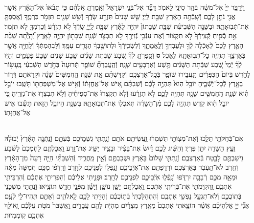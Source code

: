 \documentclass[twoside, openany, parskip=half, 11pt]{book}
\begin{document}
\begin{footnotesize}
\begin{multicols}{2}
\\
וַיְֿדַבֵּ֤ר יְיָ֙ אֶל־מֹשֶׁ֔ה בְּֿהַ֥ר סִינַ֖י לֵאמֹֽר׃ דַּבֵּ֞ר אֶל־בְּֿנֵ֤י יִשְׂרָאֵל֙ וְֿאָֽמַרְתָּ֣ אֲלֵהֶ֔ם כִּ֤י תָבֹ֨אוּ֙ אֶל־הָאָ֔רֶץ אֲשֶׁ֥ר אֲנִ֖י נֹתֵ֣ן לָכֶ֑ם וְֿשָֽׁבְֿתָ֣ה הָאָ֔רֶץ שַׁבָּ֖ת לַֽיְיָ׃ שֵׁ֤שׁ שָׁנִים֙ תִּזְרַ֣ע שָׂדֶ֔ךָ וְֿשֵׁ֥שׁ שָׁנִ֖ים תִּזְמֹ֣ר כַּרְמֶ֑ךָ וְֿאָֽסַפְתָּ֖ אֶת־תְּֿבֽוּאָתָֽהּ׃  וּבַשָּׁנָ֣ה הַשְּֿׁבִיעִ֗ת שַׁבַּ֤ת שַׁבָּתוֹן֙ יִהְיֶ֣ה לָאָ֔רֶץ שַׁבָּ֖ת לַֽיְיָ֑ שָֽׂדְֿךָ֙ לֹ֣א תִזְרָ֔ע וְֿכַרְמְךָ֖ לֹ֥א תִזְמֹֽר׃ אֵ֣ת סְֿפִ֤יחַ קְֿצִֽירְֿךָ֙ לֹ֣א תִקְצ֔וֹר וְֿאֶת־עִנְּֿבֵ֥י נְֿזִירֶ֖ךָ לֹ֣א תִבְצֹ֑ר שְֿׁנַ֥ת שַׁבָּת֖וֹן יִהְיֶ֥ה לָאָֽרֶץ׃ וְֽֿ֠הָֽיְֿתָ֠ה שַׁבַּ֨ת הָאָ֤רֶץ לָכֶם֙ לְֿאָכְֿלָ֔ה לְֿךָ֖ וּלְעַבְדְּךָ֣ וְֿלַֽאֲמָתֶ֑ךָ וְֿלִשְׂכִֽירְֿךָ֙ וּלְתוֹשָׁ֣בְךָ֔ הַגָּרִ֖ים עִמָּֽךְ׃ וְֿלִֽבְהֶמְתְּֿךָ֔ וְֿלַֽחַיָּ֖ה אֲשֶׁ֣ר בְּֿאַרְצֶ֑ךָ תִּהְיֶ֥ה כׇל־תְּֿבֽוּאָתָ֖הּ לֶֽאֱכֹֽל׃ \textbf{ס}  וְֿסָֽפַרְתָּ֣ לְֿךָ֗ שֶׁ֚בַע שַׁבְּֿתֹ֣ת שָׁנִ֔ים שֶׁ֥בַע שָׁנִ֖ים שֶׁ֣בַע פְּֿעָמִ֑ים וְֿהָי֣וּ לְֿךָ֗ יְֿמֵי֙ שֶׁ֚בַע שַׁבְּֿתֹ֣ת הַשָּׁנִ֔ים תֵּ֥שַׁע וְֿאַרְבָּעִ֖ים שָׁנָֽה׃ וְֿהַֽעֲבַרְתָּ֞ שׁוֹפַ֤ר תְּֿרוּעָה֙ בַּחֹ֣דֶשׁ הַשְּֿׁבִעִ֔י בֶּֽעָשׂ֖וֹר לַחֹ֑דֶשׁ בְּֿיוֹם֙ הַכִּפֻּרִ֔ים תַּֽעֲבִ֥ירוּ שׁוֹפָ֖ר בְּֿכָֽל־אַרְצְכֶֽם׃ וְֿקִדַּשְׁתֶּ֗ם אֵ֣ת שְֿׁנַ֤ת הַֽחֲמִשִּׁים֙ שָׁנָ֔ה וּקְרָאתֶ֥ם דְּֿר֛וֹר בָּאָ֖רֶץ לְֿכׇל־יֹֽשְֿׁבֶ֑יהָ יוֹבֵ֥ל הִוא֙ תִּהְיֶ֣ה לָכֶ֔ם וְֿשַׁבְתֶּ֗ם אִ֚ישׁ אֶל־אֲחֻזָּת֔וֹ וְֿאִ֥ישׁ אֶל־מִשְׁפַּחְתּ֖וֹ תָּשֻֽׁבוּ׃ יוֹבֵ֣ל הִ֗וא שְֿׁנַ֛ת הַֽחֲמִשִּׁ֥ים שָׁנָ֖ה תִּהְיֶ֣ה לָכֶ֑ם לֹ֣א תִזְרָ֔עוּ וְֿלֹ֤א תִקְצְרוּ֙ אֶת־סְפִיחֶ֔יהָ וְֿלֹ֥א תִבְצְר֖וּ אֶת־נְזִרֶֽיהָ׃ כִּ֚י יוֹבֵ֣ל הִ֔וא קֹ֖דֶשׁ תִּהְיֶ֣ה לָכֶ֑ם מִ֨ן־הַשָּׂדֶ֔ה תֹּֽאכְֿל֖וּ אֶת־תְּֿבֽוּאָתָֽהּ׃ בִּשְׁנַ֥ת הַיּוֹבֵ֖ל הַזֹּ֑את תָּשֻׁ֕בוּ אִ֖ישׁ אֶל־אֲחֻזָּתֽוֹ׃


\\
אִם־בְּֿחֻקֹּתַ֖י תֵּלֵ֑כוּ וְֿאֶת־מִצְוֹתַ֣י תִּשְׁמְר֔וּ וַֽעֲשִׂיתֶ֖ם אֹתָֽם׃ וְֿנָֽתַתִּ֥י גִשְׁמֵיכֶ֖ם בְּֿעִתָּ֑ם וְֿנָֽתְֿנָ֤ה הָאָ֨רֶץ֙ יְֿבוּלָ֔הּ וְֿעֵ֥ץ הַשָּׂדֶ֖ה יִתֵּ֥ן פִּרְיֽוֹ׃ וְֿהִשִּׂ֨יג לָכֶ֥ם דַּ֨יִשׁ֙ אֶת־בָּצִ֔יר וּבָצִ֖יר יַשִּׂ֣יג אֶת־זָ֑רַע וַֽאֲכַלְתֶּ֤ם לַחְמְכֶם֙ לָשֹׂ֔בַע וִֽישַׁבְתֶּ֥ם לָבֶ֖טַח בְּֿאַרְצְכֶֽם׃  וְֿנָֽתַתִּ֤י שָׁלוֹם֙ בָּאָ֔רֶץ וּשְׁכַבְתֶּ֖ם וְֿאֵ֣ין מַֽחֲרִ֑יד וְֿהִשְׁבַּתִּ֞י חַיָּ֤ה רָעָה֙ מִן־הָאָ֔רֶץ וְֿחֶ֖רֶב לֹא־תַֽעֲבֹ֥ר בְּֿאַרְצְכֶֽם׃ וּרְדַפְתֶּ֖ם אֶת־אֹֽיְֿבֵיכֶ֑ם וְֿנָֽפְֿל֥וּ לִפְנֵיכֶ֖ם לֶחָֽרֶב׃ וְֿרָֽדְֿפ֨וּ מִכֶּ֤ם חֲמִשָּׁה֙ מֵאָ֔ה וּמֵאָ֥ה מִכֶּ֖ם רְֿבָבָ֣ה יִרְדֹּ֑פוּ וְֿנָֽפְֿל֧וּ אֹֽיְֿבֵיכֶ֛ם לִפְנֵיכֶ֖ם לֶחָֽרֶב׃ וּפָנִ֣יתִי אֲלֵיכֶ֔ם וְֿהִפְרֵיתִ֣י אֶתְכֶ֔ם וְֿהִרְבֵּיתִ֖י אֶתְכֶ֑ם וַֽהֲקִֽימֹתִ֥י אֶת־בְּֿרִיתִ֖י אִתְּֿכֶֽם׃  וַֽאֲכַלְתֶּ֥ם יָשָׁ֖ן נוֹשָׁ֑ן וְֿיָשָׁ֕ן מִפְּֿנֵ֥י חָדָ֖שׁ תּוֹצִֽיאוּ׃ וְֿנָֽתַתִּ֥י מִשְׁכָּנִ֖י בְּֿתֽוֹכֲכֶ֑ם וְֿלֹֽא־תִגְעַ֥ל נַפְשִׁ֖י אֶתְכֶֽם׃ וְֿהִתְהַלַּכְתִּי֙ בְּֿת֣וֹכֲכֶ֔ם וְֿהָיִ֥יתִי לָכֶ֖ם לֵֽאלֹהִ֑ים וְֿאַתֶּ֖ם תִּֽהְיוּ־לִ֥י לְֿעָֽם׃ אֲנִ֞י יְיָ֣ אֱלֹֽהֵיכֶ֗ם אֲשֶׁ֨ר הוֹצֵ֤אתִי אֶתְכֶם֙ מֵאֶ֣רֶץ מִצְרַ֔יִם מִהְיֹ֥ת לָהֶ֖ם עֲבָדִ֑ים וָֽאֶשְׁבֹּר֙ מֹטֹ֣ת עֻלְּֿכֶ֔ם וָֽאוֹלֵ֥ךְ אֶתְכֶ֖ם קֽוֹמְֿמִיּֽוּת׃


\end{multicols}
\end{footnotesize}
\end{document}
